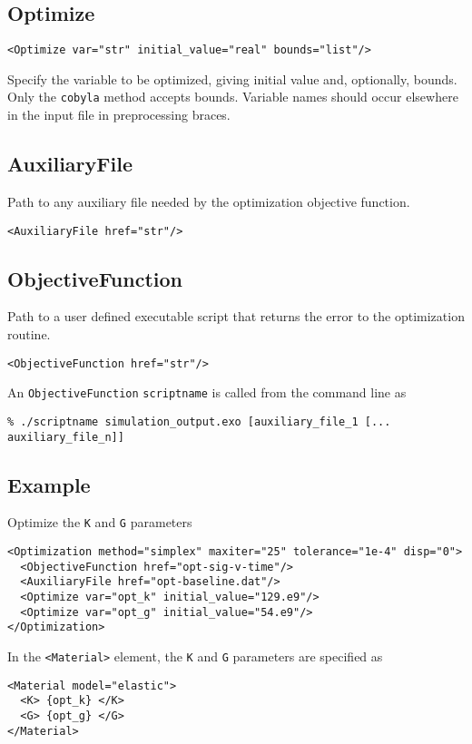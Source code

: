 \documentclass[11pt]{report}
\newcommand{\tag}[1]{\texttt{<#1>}}
\begin{document}
\subsection{Optimize}
\begin{verbatim}
<Optimize var="str" initial_value="real" bounds="list"/>
\end{verbatim}
%
Specify the variable to be optimized, giving initial value and, optionally,
bounds.  Only the \texttt{cobyla} method accepts bounds.  Variable names should
occur elsewhere in the input file in preprocessing braces.

\subsection{AuxiliaryFile}
Path to any auxiliary file needed by the optimization objective function.
\begin{verbatim}
<AuxiliaryFile href="str"/>
\end{verbatim}

\subsection{ObjectiveFunction}
Path to a user defined executable script that returns the error to the
optimization routine.
\begin{verbatim}
<ObjectiveFunction href="str"/>
\end{verbatim}

An \texttt{ObjectiveFunction} \texttt{scriptname} is called from the command
line as
\begin{verbatim}
% ./scriptname simulation_output.exo [auxiliary_file_1 [... auxiliary_file_n]]
\end{verbatim}

\subsection{Example}
Optimize the \texttt{K} and \texttt{G} parameters
\begin{verbatim}
<Optimization method="simplex" maxiter="25" tolerance="1e-4" disp="0">
  <ObjectiveFunction href="opt-sig-v-time"/>
  <AuxiliaryFile href="opt-baseline.dat"/>
  <Optimize var="opt_k" initial_value="129.e9"/>
  <Optimize var="opt_g" initial_value="54.e9"/>
</Optimization>
\end{verbatim}

In the \tag{Material} element, the \texttt{K} and \texttt{G} parameters are
specified as
%
\begin{verbatim}
<Material model="elastic">
  <K> {opt_k} </K>
  <G> {opt_g} </G>
</Material>
\end{verbatim}
\end{document}

